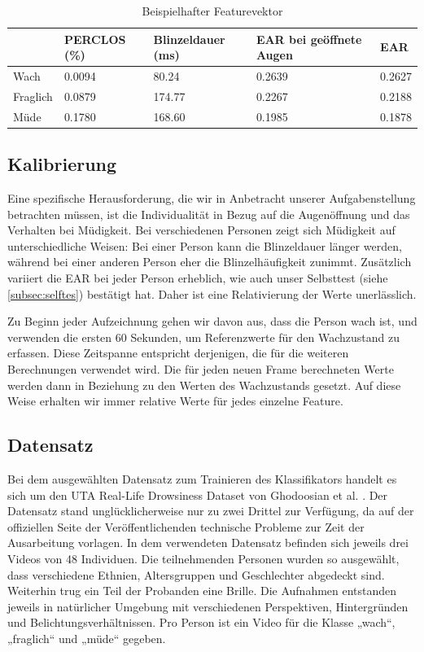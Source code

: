 \begin{table}[!ht]
    \centering
    \begin{tabular}{|l|l|l|l|l|}
    \hline
        ~ & PERCLOS (\%) & Blinzeldauer (ms) & EAR bei geöffnete Augen & EAR \\ \hline
        Wach & 0.0094 & 80.24 & 0.2639 & 0.2627 \\ \hline
        Fraglich & 0.0879 & 174.77 & 0.2267 & 0.2188 \\ \hline
        Müde & 0.1780 & 168.60 & 0.1985 & 0.1878 \\ \hline
    \end{tabular}
\caption{Beispielhafter Featurevektor}
\label{table:featurevector}
\end{table}

\subsection{Kalibrierung}
\label{sec:calibration}

Eine spezifische Herausforderung, die wir in Anbetracht unserer Aufgabenstellung betrachten müssen, ist die Individualität in Bezug auf die Augenöffnung und das Verhalten bei Müdigkeit. Bei verschiedenen Personen zeigt sich Müdigkeit auf unterschiedliche Weisen: Bei einer Person kann die Blinzeldauer länger werden, während bei einer anderen Person eher die Blinzelhäufigkeit zunimmt. Zusätzlich variiert die EAR bei jeder Person erheblich, wie auch unser Selbsttest (siehe \ref{subsec:selftes}) bestätigt hat. Daher ist eine Relativierung der Werte unerlässlich.

Zu Beginn jeder Aufzeichnung gehen wir davon aus, dass die Person wach ist, und verwenden die ersten 60 Sekunden, um Referenzwerte für den Wachzustand zu erfassen. Diese Zeitspanne entspricht derjenigen, die für die weiteren Berechnungen verwendet wird. Die für jeden neuen Frame berechneten Werte werden dann in Beziehung zu den Werten des Wachzustands gesetzt. Auf diese Weise erhalten wir immer relative Werte für jedes einzelne Feature.


\subsection{Datensatz}
Bei dem ausgewählten Datensatz zum Trainieren des Klassifikators handelt es sich um den UTA Real-Life Drowsiness Dataset von Ghodoosian et al. \cite{GH19}. Der Datensatz stand unglücklicherweise nur zu zwei Drittel zur Verfügung, da auf der offiziellen Seite der Veröffentlichenden technische Probleme zur Zeit der Ausarbeitung vorlagen. In dem verwendeten Datensatz befinden sich jeweils drei Videos von 48 Individuen. Die teilnehmenden Personen wurden so ausgewählt, dass verschiedene Ethnien, Altersgruppen und Geschlechter abgedeckt sind. Weiterhin trug ein Teil der Probanden eine Brille. Die Aufnahmen entstanden jeweils in natürlicher Umgebung mit verschiedenen Perspektiven, Hintergründen und Belichtungsverhältnissen. Pro Person ist ein Video für die Klasse „wach“, „fraglich“ und „müde“ gegeben. 

